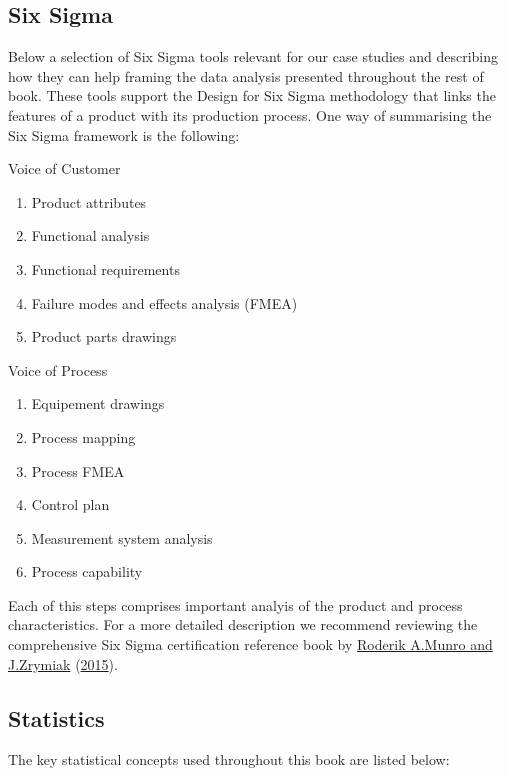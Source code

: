 \documentclass[
]{book}
\providecommand{\tightlist}{%
  \setlength{\itemsep}{0pt}\setlength{\parskip}{0pt}}
\begin{document}
\hypertarget{six-sigma}{%
\subsection{Six Sigma}\label{six-sigma}}

Below a selection of Six Sigma tools relevant for our case studies and describing how they can help framing the data analysis presented throughout the rest of book. These tools support the Design for Six Sigma methodology that links the features of a product with its production process. One way of summarising the Six Sigma framework is the following:

Voice of Customer

\begin{enumerate}
\def\labelenumi{\arabic{enumi}.}
\tightlist
\item
  Product attributes
\item
  Functional analysis
\item
  Functional requirements
\item
  Failure modes and effects analysis (FMEA)
\item
  Product parts drawings
\end{enumerate}

Voice of Process

\begin{enumerate}
\def\labelenumi{\arabic{enumi}.}
\tightlist
\item
  Equipement drawings
\item
  Process mapping
\item
  Process FMEA
\item
  Control plan
\item
  Measurement system analysis
\item
  Process capability
\end{enumerate}

Each of this steps comprises important analyis of the product and process characteristics. For a more detailed description we recommend reviewing the comprehensive Six Sigma certification reference book by \protect\hyperlink{ref-Munro2015}{Roderik A.Munro and J.Zrymiak} (\protect\hyperlink{ref-Munro2015}{2015}).

\hypertarget{statistics}{%
\subsection{Statistics}\label{statistics}}

The key statistical concepts used throughout this book are listed below:
\end{document}
